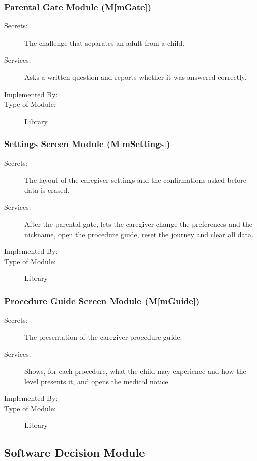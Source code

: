 \documentclass[12pt, titlepage]{article}
\newcommand{\mref}[1]{\hyperref[#1]{M\ref*{#1}}}
\begin{document}
\subsubsection{Parental Gate Module (\mref{mGate})}

\begin{description}
\item[Secrets:] The challenge that separates an adult from a child.
\item[Services:] Asks a written question and reports whether it was answered
  correctly.
\item[Implemented By:] \progname{}
\item[Type of Module:] Library
\end{description}

\subsubsection{Settings Screen Module (\mref{mSettings})}

\begin{description}
\item[Secrets:] The layout of the caregiver settings and the confirmations asked
  before data is erased.
\item[Services:] After the parental gate, lets the caregiver change the
  preferences and the nickname, open the procedure guide, reset the journey and
  clear all data.
\item[Implemented By:] \progname{}
\item[Type of Module:] Library
\end{description}

\subsubsection{Procedure Guide Screen Module (\mref{mGuide})}

\begin{description}
\item[Secrets:] The presentation of the caregiver procedure guide.
\item[Services:] Shows, for each procedure, what the child may experience and
  how the level presents it, and opens the medical notice.
\item[Implemented By:] \progname{}
\item[Type of Module:] Library
\end{description}

\subsection{Software Decision Module}
\end{document}
